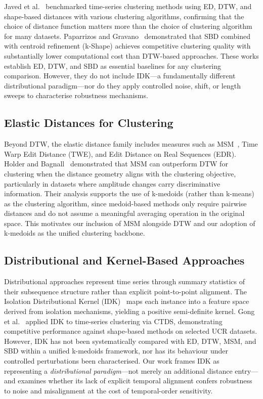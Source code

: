 Javed et al.~\cite{javed2020benchmark} benchmarked time-series clustering methods using ED, DTW, and shape-based distances with various clustering algorithms, confirming that the choice of distance function matters more than the choice of clustering algorithm for many datasets.
Paparrizos and Gravano~\cite{paparrizos2015kshape} demonstrated that SBD combined with centroid refinement (k-Shape) achieves competitive clustering quality with substantially lower computational cost than DTW-based approaches.
These works establish ED, DTW, and SBD as essential baselines for any clustering comparison.
However, they do not include IDK---a fundamentally different distributional paradigm---nor do they apply controlled noise, shift, or length sweeps to characterise robustness mechanisms.

\subsection{Elastic Distances for Clustering}\label{sec:rw-elastic}

Beyond DTW, the elastic distance family includes measures such as MSM~\cite{stefan2013msm}, Time Warp Edit Distance (TWE), and Edit Distance on Real Sequences (EDR).
Holder and Bagnall~\cite{holder2023msm} demonstrated that MSM can outperform DTW for clustering when the distance geometry aligns with the clustering objective, particularly in datasets where amplitude changes carry discriminative information.
Their analysis supports the use of k-medoids (rather than k-means) as the clustering algorithm, since medoid-based methods only require pairwise distances and do not assume a meaningful averaging operation in the original space.
This motivates our inclusion of MSM alongside DTW and our adoption of k-medoids as the unified clustering backbone.

\subsection{Distributional and Kernel-Based Approaches}\label{sec:rw-distributional}

Distributional approaches represent time series through summary statistics of their subsequence structure rather than explicit point-to-point alignment.
The Isolation Distributional Kernel (IDK)~\cite{ting2022idk} maps each instance into a feature space derived from isolation mechanisms, yielding a positive semi-definite kernel.
Gong et al.~\cite{gong2024ctds} applied IDK to time-series clustering via CTDS, demonstrating competitive performance against shape-based methods on selected UCR datasets.
However, IDK has not been systematically compared with ED, DTW, MSM, and SBD within a unified k-medoids framework, nor has its behaviour under controlled perturbations been characterised.
Our work frames IDK as representing a \emph{distributional paradigm}---not merely an additional distance entry---and examines whether its lack of explicit temporal alignment confers robustness to noise and misalignment at the cost of temporal-order sensitivity.

